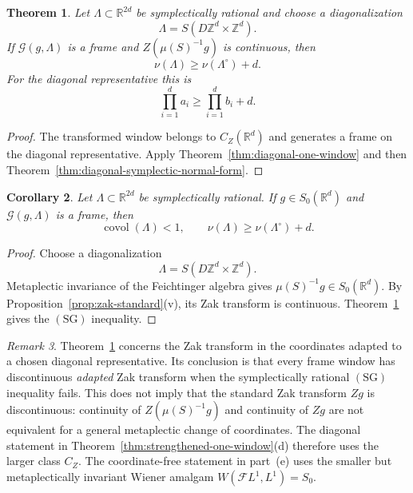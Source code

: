 \documentclass[11pt,reqno]{amsart}
\numberwithin{equation}{section}
\newtheorem{theorem}{Theorem}[section]
\newtheorem{corollary}[theorem]{Corollary}
\theoremstyle{definition}
\theoremstyle{remark}
\newtheorem{remark}[theorem]{Remark}
\newcommand{\R}{\mathbb R}
\newcommand{\Z}{\mathbb Z}
\newcommand{\covol}{\operatorname{covol}}
\newcommand{\G}{\mathcal G}
\newcommand{\SG}{\ensuremath{(\mathrm{SG})}\xspace}
\newcommand{\CZ}{C_Z}
\newcommand{\Szero}{S_0}
\begin{document}
\begin{theorem}
\label{thm:rational-zak-obstruction}
Let $\Lambda\subset\R^{2d}$ be symplectically rational and choose a
diagonalization
\[
                         \Lambda=S(D\Z^d\times\Z^d).
\]
If $\G(g,\Lambda)$ is a frame and
$Z(\mu(S)^{-1}g)$ is continuous, then
\[
                   \nu(\Lambda)\ge\nu(\Lambda^\circ)+d.
\]
For the diagonal representative this is
\[
                   \prod_{i=1}^d a_i
                   \ge \prod_{i=1}^d b_i+d.
\]
\end{theorem}

\begin{proof}
The transformed window belongs to $\CZ(\R^d)$ and generates a frame on the
diagonal representative.  Apply Theorem~\ref{thm:diagonal-one-window} and
then Theorem~\ref{thm:diagonal-symplectic-normal-form}.
\end{proof}

\begin{corollary}
\label{cor:rational-S0-obstruction}
Let $\Lambda\subset\R^{2d}$ be symplectically rational.  If
$g\in\Szero(\R^d)$ and $\G(g,\Lambda)$ is a frame, then
\[
 \covol(\Lambda)<1,
 \qquad
 \nu(\Lambda)\ge\nu(\Lambda^\circ)+d.
\]
\end{corollary}

\begin{proof}
Choose a diagonalization
\[
             \Lambda=S(D\Z^d\times\Z^d).
\]
Metaplectic invariance of the Feichtinger algebra gives
$\mu(S)^{-1}g\in\Szero(\R^d)$.  By Proposition~\ref{prop:zak-standard}(v), its Zak transform is continuous.
Theorem~\ref{thm:rational-zak-obstruction} gives the $\SG$ inequality.
\end{proof}

\begin{remark}
Theorem~\ref{thm:rational-zak-obstruction} concerns the Zak transform in the
coordinates adapted to a chosen diagonal representative.  Its conclusion is
that every frame window has discontinuous \emph{adapted} Zak transform when
the symplectically rational $\SG$ inequality fails.  This does not imply that
the standard Zak transform $Zg$ is discontinuous: continuity of
$Z(\mu(S)^{-1}g)$ and continuity of $Zg$ are not equivalent for a general
metaplectic change of coordinates.  The diagonal statement in
Theorem~\ref{thm:strengthened-one-window}(d) therefore uses the larger class
$\CZ$.  The coordinate-free statement in part~(e) uses the smaller but
metaplectically invariant Wiener amalgam
$W(\mathcal F L^1,L^1)=\Szero$.
\end{remark}
\end{document}
